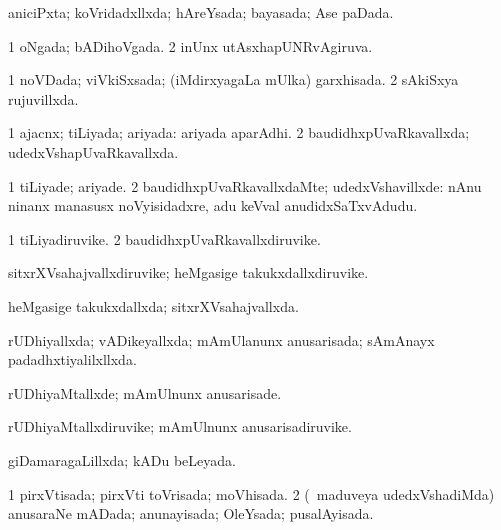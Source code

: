 {{\bentry
{} 
\gl{\gu}
\expl{}
\bmng
aniciPxta; koVridadxllxda; hAreYsada; bayasada; Ase paDada. 
\emng
\eentry

\bentry
{} 
\gl{\gu}
\expl{}
\bmng
\bnum
\num{1} oNgada; bADihoVgada. 
\num{2} inUnx utAsxhapUNRvAgiruva. 
\enum
\emng
\eentry

\bentry
{} 
\gl{\gu}
\expl{}
\bmng
\bnum
\num{1} noVDada; viVkiSxsada; (iMdirxyagaLa mUlka) garxhisada. 
\num{2} sAkiSxya rujuvillxda. 
\enum
\emng
\eentry

\bentry
{} 
\gl{\gu}
\expl{}
\bmng
\bnum
\num{1} ajacnx; tiLiyada; ariyada:  ariyada aparAdhi. 
\num{2} baudidhxpUvaRkavallxda; udedxVshapUvaRkavallxda. 
\enum
\emng
\eentry

\bentry
{} 
\gl{\kirxvi}
\expl{}
\bmng
\bnum
\num{1} tiLiyade; ariyade. 
\num{2} baudidhxpUvaRkavallxdaMte; udedxVshavillxde:  nAnu ninanx manasusx noVyisidadxre, adu keVval anudidxSaTxvAdudu. 
\enum
\emng
\eentry

\bentry
{} 
\gl{\nA}
\expl{}
\bmng
\bnum
\num{1} tiLiyadiruvike. 
\num{2} baudidhxpUvaRkavallxdiruvike. 
\enum
\emng
\eentry

\bentry
{} 
\gl{\nA}
\expl{}
\bmng
sitxrXVsahajvallxdiruvike; heMgasige takukxdallxdiruvike. 
\emng
\eentry

\bentry
{} 
\gl{\gu}
\expl{}
\bmng
heMgasige takukxdallxda; sitxrXVsahajvallxda. 
\emng
\eentry

\bentry
{} 
\gl{\gu}
\expl{}
\bmng
rUDhiyallxda; vADikeyallxda; mAmUlanunx anusarisada; sAmAnayx padadhxtiyalilxllxda. 
\emng
\eentry

\bentry
{} 
\gl{\kirxvi}
\expl{}
\bmng
rUDhiyaMtallxde; mAmUlnunx anusarisade. 
\emng
\eentry

\bentry
{} 
\gl{\nA}
\expl{}
\bmng
rUDhiyaMtallxdiruvike; mAmUlnunx anusarisadiruvike. 
\emng
\eentry

\bentry
{} 
\gl{\gu}
\expl{}
\bmng
giDamaragaLillxda; kADu beLeyada. 
\emng
\eentry

\bentry
{} 
\gl{\gu}
\expl{}
\bmng
\bnum
\num{1} pirxVtisada; pirxVti toVrisada; moVhisada. 
\num{2} (\kanmu\ maduveya udedxVshadiMda) anusaraNe mADada; anunayisada; OleYsada; pusalAyisada. 
\enum
\emng
\eentry

}}
